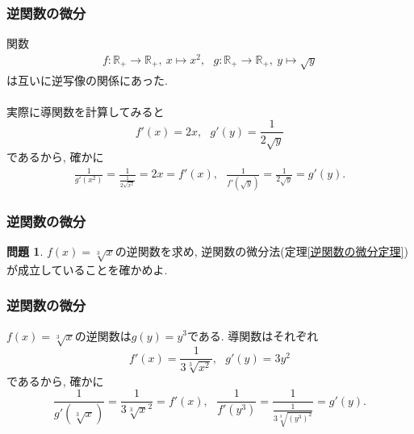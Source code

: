 \documentclass[dvipdfmx,cjk,10.2pt]{beamer}
\newcommand{\R}{\mathbb{R}}
\theoremstyle{definition}
\newtheorem{Prob}[Thm]{問題}
\begin{document}
\begin{frame}
\frametitle{逆関数の微分}


関数
\begin{align*}
f: \R_+ \longrightarrow \R_+,  \  x \mapsto x^2, \ \ \ g: \R_+ \longrightarrow \R_+,  \ y \mapsto \sqrt{y}
\end{align*}
は互いに逆写像の関係にあった. \\
\ \\

実際に導関数を計算してみると
$$
f'(x)=2x, \ \ \ g'(y)= \frac{1}{2\sqrt{y}}
$$
であるから, 確かに
\begin{align*}
 \frac{1}{g'(x^2)} = \frac{1}{\frac{1}{2\sqrt{x^2}}}=2x =f'(x), \ \ \ \frac{1}{f'(\sqrt{y})}=\frac{1}{2\sqrt{y}}=g'(y). 
\end{align*}



\end{frame}





\begin{frame}
\frametitle{逆関数の微分}

\begin{Prob}
$f(x)=\sqrt[3]{x}$の逆関数を求め, 逆関数の微分法(定理\ref{逆関数の微分定理})が成立していることを確かめよ. 
\end{Prob}

\end{frame}





\begin{frame}
\frametitle{逆関数の微分}


$f(x)=\sqrt[3]{x}$の逆関数は$g(y)=y^3$である. 導関数はそれぞれ
$$
f'(x)=\frac{1}{3 \sqrt[3]{x^2}}, \ \ \ g'(y)=3y^2
$$
であるから, 確かに
$$
\frac{1}{g'(\sqrt[3]{x})}=\frac{1}{3\sqrt[3]{x}^2}=f'(x), \ \ \ 
\frac{1}{f'(y^3)}=\frac{1}{\frac{1}{3 \sqrt[3]{(y^3)^2}}}=g'(y). 
$$

\end{frame}



\end{document}
